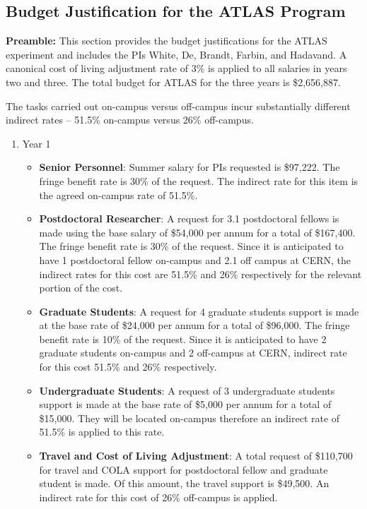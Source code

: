\subsection{Budget Justification for the ATLAS Program}
{\bf Preamble:} This section provides the budget justifications for the ATLAS experiment and includes the PIs White, De, Brandt, Farbin, and Hadavand.  A canonical cost of living adjustment rate of 3\% is applied to all salaries in years two and three. 
The total budget for ATLAS for the three years is \$2,656,887.

The tasks carried out on-campus versus off-campus incur substantially different indirect rates – 51.5\% on-campus versus 26\% off-campus. 

\begin{enumerate}
\item{Year 1}
\begin{itemize}
\item{{\bf Senior Personnel}: Summer salary for PIs requested is \$97,222.   The fringe benefit rate is 30\% of the request.  The indirect rate for this item is the agreed on-campus rate of 51.5\%.}

\item {{\bf Postdoctoral Researcher}: A request for 3.1 postdoctoral fellows is made using the base salary of \$54,000 per annum for a total of \$167,400.  The fringe benefit rate is 30\% of the request.  Since it is anticipated to have 1 postdoctoral fellow on-campus and 2.1 off campus at CERN, the indirect rates for this cost are 51.5\%  and 26\% respectively for the relevant portion of the cost.} 

\item{{\bf Graduate Students}: A request for 4 graduate students support is made at the base rate of \$24,000 per annum for a total of \$96,000.   The fringe benefit rate is 10\% of the request.  Since it is anticipated to have 2 graduate students on-campus and 2 off-campus at CERN, indirect rate for this cost 51.5\% and 26\% respectively.}

\item {{\bf Undergraduate Students}: A request of 3 undergraduate students support is made at the base rate of \$5,000 per annum for a total of \$15,000. They will be located on-campus therefore an indirect rate of 51.5\% is applied to this rate. }

\item{{\bf Travel and Cost of Living Adjustment}: A total request of \$110,700 for travel and COLA support for postdoctoral fellow and graduate student is made. Of this amount, the travel support is \$49,500.  An indirect rate for this cost of 26\% off-campus is applied. }


\end{itemize}
\end{enumerate}
